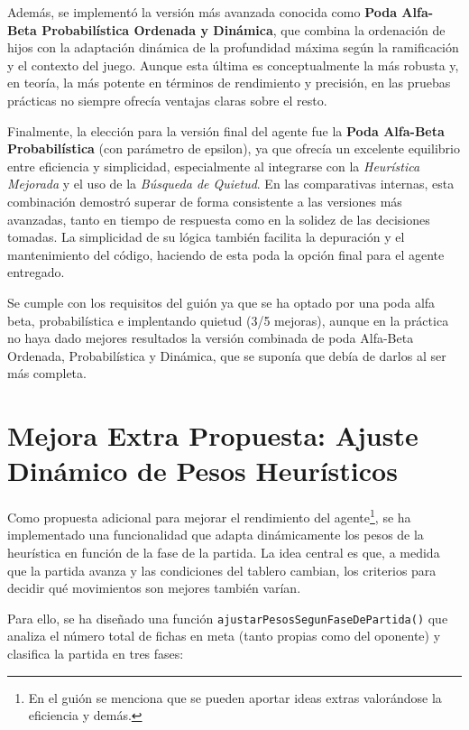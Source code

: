 Además, se implementó la versión más avanzada conocida como \textbf{Poda Alfa-Beta Probabilística Ordenada y Dinámica}, que combina la ordenación de hijos con la adaptación dinámica de la profundidad máxima según la ramificación y el contexto del juego. Aunque esta última es conceptualmente la más robusta y, en teoría, la más potente en términos de rendimiento y precisión, en las pruebas prácticas no siempre ofrecía ventajas claras sobre el resto.

Finalmente, la elección para la versión final del agente fue la \textbf{Poda Alfa-Beta Probabilística} (con parámetro de epsilon), ya que ofrecía un excelente equilibrio entre eficiencia y simplicidad, especialmente al integrarse con la \emph{Heurística Mejorada} y el uso de la \textit{Búsqueda de Quietud}. En las comparativas internas, esta combinación demostró superar de forma consistente a las versiones más avanzadas, tanto en tiempo de respuesta como en la solidez de las decisiones tomadas. La simplicidad de su lógica también facilita la depuración y el mantenimiento del código, haciendo de esta poda la opción final para el agente entregado.

Se cumple con los requisitos del guión ya que se ha optado por una poda alfa beta, probabilística e implentando quietud (3/5 mejoras), aunque en la práctica no haya dado mejores resultados la versión combinada de poda Alfa-Beta Ordenada, Probabilística y Dinámica, que se suponía que debía de darlos al ser más completa.

\chapter*{Mejora Extra Propuesta: Ajuste Dinámico de Pesos Heurísticos}

Como propuesta adicional para mejorar el rendimiento del agente\footnote{En el guión se menciona que se pueden aportar ideas extras valorándose la eficiencia y demás.}, se ha implementado una funcionalidad que adapta dinámicamente los pesos de la heurística en función de la fase de la partida. La idea central es que, a medida que la partida avanza y las condiciones del tablero cambian, los criterios para decidir qué movimientos son mejores también varían.

Para ello, se ha diseñado una función \texttt{ajustarPesosSegunFaseDePartida()} que analiza el número total de fichas en meta (tanto propias como del oponente) y clasifica la partida en tres fases:

